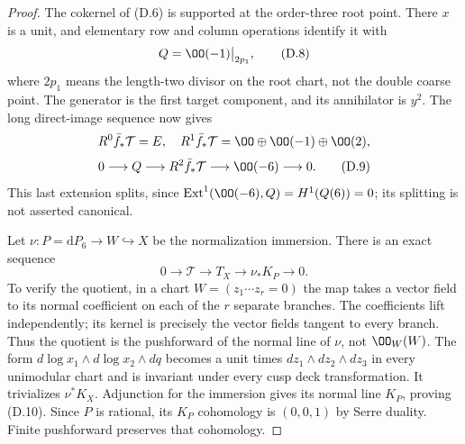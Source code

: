 \begin{proof}
The cokernel of (D.6) is supported at the order-three root point. There
$x$ is a unit, and elementary row and column operations identify it
with
\[
 Q=\OO(-1)\big|_{2p_1},                               \tag{D.8}
\]
where $2p_1$ means the length-two divisor on the root chart, not the
double coarse point. The generator is the first target component,
and its annihilator is $y^2$. The long direct-image sequence now gives
\[
 R^0\bar f_*\mathcal T=E,\quad
 R^1\bar f_*\mathcal T=\OO\oplus\OO(-1)\oplus\OO(2),
\]
\[
 0\longrightarrow Q\longrightarrow R^2\bar f_*\mathcal T
 \longrightarrow\OO(-6)\longrightarrow0.              \tag{D.9}
\]
This last extension splits, since $\operatorname{Ext}^1(\OO(-6),Q)
=H^1(Q(6))=0$; its splitting is not asserted canonical.

Let $\nu:P=\mathrm dP_6\to W\hookrightarrow X$ be the normalization
immersion. There is an exact sequence
\[
 0\longrightarrow\mathcal T\longrightarrow T_X
 \longrightarrow\nu_*K_P\longrightarrow0.             \tag{D.10}
\]
To verify the quotient, in a chart $W=(z_1\cdots z_r=0)$ the map takes
a vector field to its normal coefficient on each of the $r$ separate
branches. The coefficients lift independently; its kernel is precisely
the vector fields tangent to every branch. Thus the quotient is the
pushforward of the normal line of $\nu$, not $\OO_W(W)$.
The form $d\log x_1\wedge d\log x_2\wedge dq$ becomes a unit times
$dz_1\wedge dz_2\wedge dz_3$ in every unimodular chart and is invariant
under every cusp deck transformation. It trivializes $\nu^*K_X$.
Adjunction for the immersion gives its normal line $K_P$, proving
(D.10). Since $P$ is rational, its $K_P$ cohomology is $(0,0,1)$ by
Serre duality. Finite pushforward preserves that cohomology.


\end{proof}
